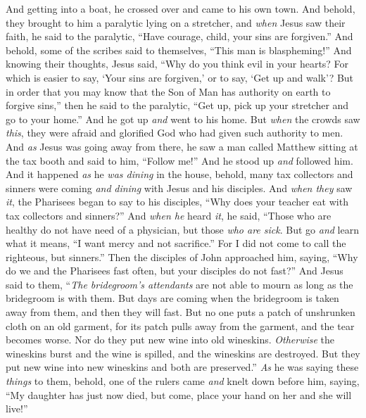 \begin{biblechapter} %
 And getting into a boat, he crossed over and came to his own town.
\verse And behold, they brought to him a paralytic lying on a stretcher, and \textit{when} Jesus saw their faith, he said to the paralytic, “Have courage, child, your sins are forgiven.”
\verse And behold, some of the scribes said to themselves, “This man is blaspheming!”
\verse And knowing their thoughts, Jesus said, “Why do you think evil in your hearts?
\verse For which is easier to say, ‘Your sins are forgiven,’ or to say, ‘Get up and walk’?
\verse But in order that you may know that the Son of Man has authority on earth to forgive sins,” then he said to the paralytic, “Get up, pick up your stretcher and go to your home.”
\verse And he got up \textit{and} went to his home.
\verse But \textit{when} the crowds saw \textit{this}, they were afraid and glorified God who had given such authority to men.
 And \textit{as} Jesus was going away from there, he saw a man called Matthew sitting at the tax booth and said to him, “Follow me!” And he stood up \textit{and} followed him.
\verse And it happened \textit{as} he \textit{was dining} in the house, behold, many tax collectors and sinners were coming \textit{and} \textit{dining} with Jesus and his disciples.
\verse And \textit{when they} saw \textit{it}, the Pharisees began to say to his disciples, “Why does your teacher eat with tax collectors and sinners?”
\verse And \textit{when he} heard \textit{it}, he said, “Those who are healthy do not have need of a physician, but those \textit{who are sick}.
\verse But go \textit{and} learn what it means, “I want mercy and not sacrifice.” For I did not come to call the righteous, but sinners.”
 Then the disciples of John approached him, saying, “Why do we and the Pharisees fast often, but your disciples do not fast?”
\verse And Jesus said to them, “\textit{The bridegroom’s attendants} are not able to mourn as long as the bridegroom is with them. But days are coming when the bridegroom is taken away from them, and then they will fast.
\verse But no one puts a patch of unshrunken cloth on an old garment, for its patch pulls away from the garment, and the tear becomes worse.
\verse Nor do they put new wine into old wineskins. \textit{Otherwise} the wineskins burst and the wine is spilled, and the wineskins are destroyed. But they put new wine into new wineskins and both are preserved.”
 \textit{As} he was saying these \textit{things} to them, behold, one of the rulers came \textit{and} knelt down before him, saying, “My daughter has just now died, but come, place your hand on her and she will live!”

\end{biblechapter}
